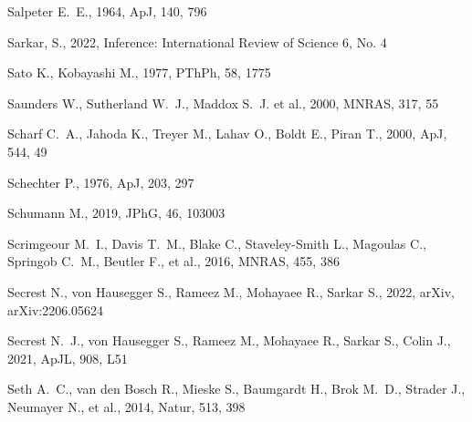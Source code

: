 \documentclass[fleqn,12pt]{article}
\begin{document}
\begin{thebibliography}{}
 Salpeter E.~E., 1964, ApJ, 140, 796

 Sarkar, S., 2022, Inference: International Review of Science 6, No. 4

 Sato K., Kobayashi M., 1977, PThPh, 58, 1775

 Saunders W., Sutherland W.~J., Maddox S.~J. et al., 2000, MNRAS, 317, 55

 Scharf C.~A., Jahoda K., Treyer M., Lahav O., Boldt E., Piran T., 2000, ApJ, 544, 49


 Schechter P., 1976, ApJ, 203, 297

 Schumann M., 2019, JPhG, 46, 103003


 Scrimgeour M.~I., Davis T.~M., Blake C., Staveley-Smith L., Magoulas C., Springob C.~M., Beutler F., et al., 2016, MNRAS, 455, 386

 Secrest N., von Hausegger S., Rameez M., Mohayaee R., Sarkar S., 2022, arXiv, arXiv:2206.05624

 Secrest N.~J., von Hausegger S., Rameez M., Mohayaee R., Sarkar S., Colin J., 2021, ApJL, 908, L51 %

 Seth A.~C., van den Bosch R., Mieske S., Baumgardt H., Brok M.~D., Strader J., Neumayer N., et al., 2014, Natur, 513, 398



\end{thebibliography}
\end{document}
